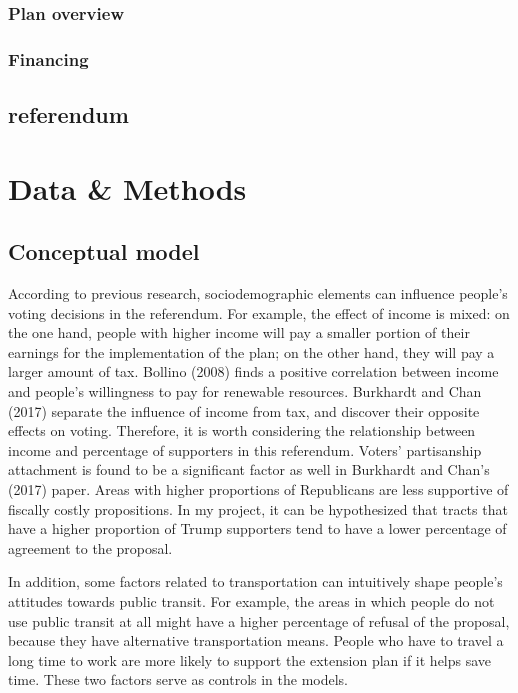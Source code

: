 \documentclass[
]{article}
\begin{document}
\hypertarget{plan-overview}{%
\subsubsection{Plan overview}\label{plan-overview}}

\hypertarget{financing}{%
\subsubsection{Financing}\label{financing}}

\hypertarget{referendum}{%
\subsection{referendum}\label{referendum}}

\hypertarget{data-methods}{%
\section{Data \& Methods}\label{data-methods}}

\hypertarget{conceptual-model}{%
\subsection{Conceptual model}\label{conceptual-model}}

According to previous research, sociodemographic elements can influence
people's voting decisions in the referendum. For example, the effect of
income is mixed: on the one hand, people with higher income will pay a
smaller portion of their earnings for the implementation of the plan; on
the other hand, they will pay a larger amount of tax. Bollino (2008)
finds a positive correlation between income and people's willingness to
pay for renewable resources. Burkhardt and Chan (2017) separate the
influence of income from tax, and discover their opposite effects on
voting. Therefore, it is worth considering the relationship between
income and percentage of supporters in this referendum. Voters'
partisanship attachment is found to be a significant factor as well in
Burkhardt and Chan's (2017) paper. Areas with higher proportions of
Republicans are less supportive of fiscally costly propositions. In my
project, it can be hypothesized that tracts that have a higher
proportion of Trump supporters tend to have a lower percentage of
agreement to the proposal.

In addition, some factors related to transportation can intuitively
shape people's attitudes towards public transit. For example, the areas
in which people do not use public transit at all might have a higher
percentage of refusal of the proposal, because they have alternative
transportation means. People who have to travel a long time to work are
more likely to support the extension plan if it helps save time. These
two factors serve as controls in the models.
\end{document}
